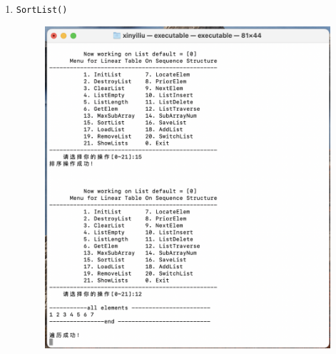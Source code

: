 \documentclass[supercite]{Experimental_Report}
\theoremstyle{definition}
\begin{document}
\begin{enumerate}
	\item \verb|SortList()|
	\begin{figure}[!htb]
		\includegraphics[width=0.8\linewidth]{images/截屏2023-06-01 22.16.47.png}
	\end{figure}
	\FloatBarrier
	
	\newpage


\end{enumerate}
\end{document}
